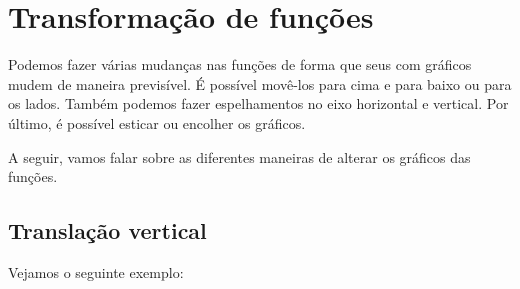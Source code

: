 \chapter{Transformação de funções}

Podemos fazer várias mudanças nas funções de forma que seus com gráficos mudem de maneira previsível. É possível movê-los para cima e para baixo ou para os lados. Também podemos fazer espelhamentos no eixo horizontal e vertical. Por último, é possível esticar ou encolher os gráficos.

A seguir, vamos falar sobre as diferentes maneiras de alterar os gráficos das funções.

 \section{Translação vertical}

 Vejamos o seguinte exemplo:

